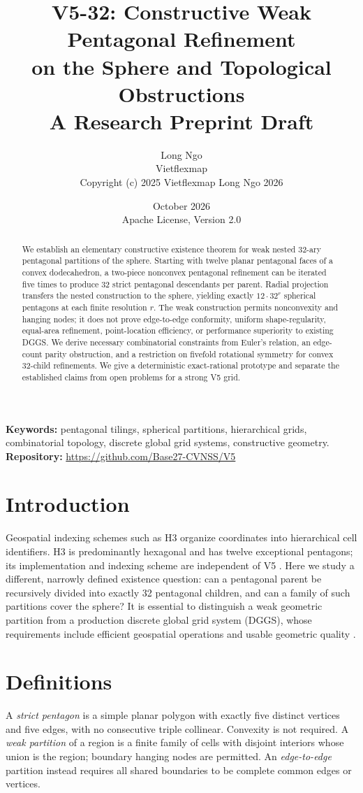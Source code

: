 \documentclass[11pt,a4paper]{article}
\title{V5-32: Constructive Weak Pentagonal Refinement\\
on the Sphere and Topological Obstructions\\
{\large A Research Preprint Draft}}
\author{Long Ngo\\
Vietflexmap\\
\small Copyright (c) 2025 Vietflexmap \quad \small Long Ngo 2026}
\date{October 2026\\{\small Apache License, Version 2.0}}
\begin{document}
\maketitle
\begin{abstract}
We establish an elementary constructive existence theorem for weak nested
32-ary pentagonal partitions of the sphere. Starting with twelve planar
pentagonal faces of a convex dodecahedron, a two-piece nonconvex pentagonal
refinement can be iterated five times to produce 32 strict pentagonal
descendants per parent. Radial projection transfers the nested construction
to the sphere, yielding exactly $12\cdot32^r$ spherical pentagons at each
finite resolution $r$. The weak construction permits nonconvexity and
hanging nodes; it does not prove edge-to-edge conformity, uniform
shape-regularity, equal-area refinement, point-location efficiency, or
performance superiority to existing DGGS. We derive necessary combinatorial
constraints from Euler's relation, an edge-count parity obstruction, and a
restriction on fivefold rotational symmetry for convex 32-child refinements.
We give a deterministic exact-rational prototype and separate the established
claims from open problems for a strong V5 grid.
\end{abstract}
\noindent\textbf{Keywords:} pentagonal tilings, spherical partitions,
hierarchical grids, combinatorial topology, discrete global grid systems,
constructive geometry.\\
\noindent\textbf{Repository:} \url{https://github.com/Base27-CVNSS/V5}

\section{Introduction}
Geospatial indexing schemes such as H3 organize coordinates into hierarchical
cell identifiers. H3 is predominantly hexagonal and has twelve exceptional
pentagons; its implementation and indexing scheme are independent of V5
\cite{h3docs,h3code}. Here we study a different, narrowly defined existence
question: can a pentagonal parent be recursively divided into exactly 32
pentagonal children, and can a family of such partitions cover the sphere?
It is essential to distinguish a weak geometric partition from a production
discrete global grid system (DGGS), whose requirements include efficient
geospatial operations and usable geometric quality \cite{ogc}.

\section{Definitions}
A \emph{strict pentagon} is a simple planar polygon with exactly five distinct
vertices and five edges, with no consecutive triple collinear. Convexity is
not required. A \emph{weak partition} of a region is a finite family of cells
with disjoint interiors whose union is the region; boundary hanging nodes
are permitted. An \emph{edge-to-edge} partition instead requires all shared
boundaries to be complete common edges or vertices.
\end{document}
